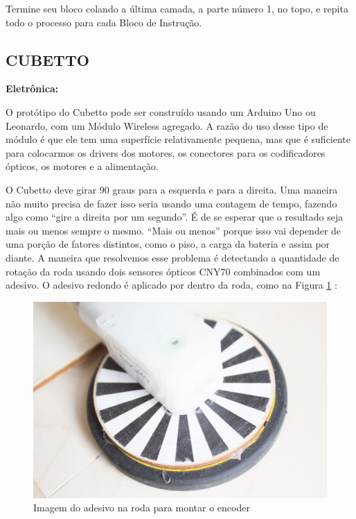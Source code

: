 \documentclass[paper=a4, fontsize=11pt]{scrartcl} %
\numberwithin{equation}{section} %
\numberwithin{figure}{section} %
\numberwithin{table}{section} %
\begin{document}
Termine seu bloco colando a última camada, a parte número 1, no topo, e repita todo o processo para cada Bloco de Instrução.

\subsection{CUBETTO}

\textbf{Eletrônica:}

O protótipo do Cubetto pode ser construído usando um Arduino Uno ou Leonardo, com um Módulo Wireless agregado. A razão do uso desse tipo de módulo é que ele tem uma superfície relativamente pequena, mas que é suficiente para colocarmos os drivers dos motores, os conectores para os codificadores ópticos, os motores e a alimentação. 

O Cubetto deve girar 90 graus para a esquerda e para a direita. Uma maneira não muito precisa de fazer isso seria usando uma contagem de tempo, fazendo algo como “gire a direita por um segundo”. É de se esperar que o resultado seja mais ou menos sempre o mesmo. “Mais ou menos” porque isso vai depender de uma porção de fatores distintos, como o piso, a carga da bateria e assim por diante. A maneira que resolvemos esse problema é detectando a quantidade de rotação da roda usando dois sensores ópticos CNY70 combinados com um adesivo. O adesivo redondo é aplicado por dentro da roda, como na Figura \ref {fig:encoder} :

\begin{figure}[h] %
  \centering
  \includegraphics[scale=0.10]{./imagens/diy-docs-14.jpg}
  \caption[ ]{Imagem do adesivo na roda para montar o encoder }
  \label{fig:encoder}
\end{figure}
\end{document}
